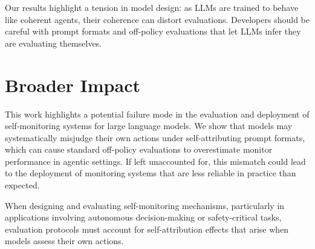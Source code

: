Our results highlight a tension in model design: as LLMs are trained to behave like coherent agents, their coherence can distort evaluations. Developers should be careful with prompt formats and off-policy evaluations that let LLMs infer they are evaluating themselves. 


\section*{Broader Impact}

This work highlights a potential failure mode in the evaluation and deployment of self-monitoring systems for large language models. We show that models may systematically misjudge their own actions under self-attributing prompt formats, which can cause standard off-policy evaluations to overestimate monitor performance in agentic settings. If left unaccounted for, this mismatch could lead to the deployment of monitoring systems that are less reliable in practice than expected.

When designing and evaluating self-monitoring mechanisms, particularly in applications involving autonomous decision-making or safety-critical tasks, evaluation protocols must account for self-attribution effects that arise when models assess their own actions.